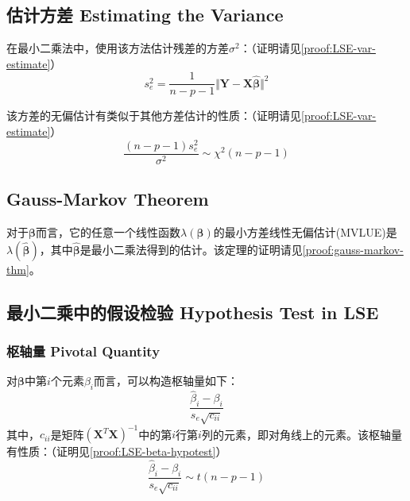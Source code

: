 \documentclass{MGLSA-cn-book-math}
\begin{document}
\subsection{估计方差 Estimating the Variance}
在最小二乘法中，使用该方法估计残差的方差$\sigma^2$：（证明请见\ref{proof:LSE-var-estimate}）
\[
	s_e^2=\frac{1}{n-p-1}\Vert\bm{Y}-\bm{X}\bm{\hat\beta}\Vert^2
\]

该方差的无偏估计有类似于其他方差估计的性质：（证明请见\ref{proof:LSE-var-estimate}）
\[
	\frac{(n-p-1)s_e^2}{\sigma^2}\sim\chi^2(n-p-1)
\]

\subsection{Gauss-Markov Theorem}
对于$\bm{\beta}$而言，它的任意一个线性函数$\lambda(\bm{\beta})$的最小方差线性无偏估计(MVLUE)是$\lambda(\hat{\bm\beta})$，其中$\hat{\bm\beta}$是最小二乘法得到的估计。该定理的证明请见\ref{proof:gauss-markov-thm}。

\subsection{最小二乘中的假设检验 Hypothesis Test in LSE}
\subsubsection{枢轴量 Pivotal Quantity}
对$\bm\beta$中第$i$个元素$\beta_i$而言，可以构造枢轴量如下：
\[
	\frac{\hat\beta_i-\beta_i}{s_e\sqrt{c_{ii}}}
\]
其中，$c_{ii}$是矩阵$(\bm{X}^T\bm{X})^{-1}$中的第$i$行第$i$列的元素，即对角线上的元素。该枢轴量有性质：（证明见\ref{proof:LSE-beta-hypotest}）
\[
	\frac{\hat\beta_i-\beta_i}{s_e\sqrt{c_{ii}}}\sim t(n-p-1)
\]
\end{document}
